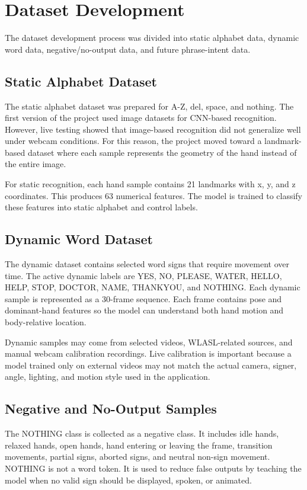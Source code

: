\section{Dataset Development}

The dataset development process was divided into static alphabet data, dynamic word data, negative/no-output data, and future phrase-intent data.

\subsection{Static Alphabet Dataset}

The static alphabet dataset was prepared for A-Z, del, space, and nothing. The first version of the project used image datasets for CNN-based recognition. However, live testing showed that image-based recognition did not generalize well under webcam conditions. For this reason, the project moved toward a landmark-based dataset where each sample represents the geometry of the hand instead of the entire image.

For static recognition, each hand sample contains 21 landmarks with x, y, and z coordinates. This produces 63 numerical features. The model is trained to classify these features into static alphabet and control labels.

\subsection{Dynamic Word Dataset}

The dynamic dataset contains selected word signs that require movement over time. The active dynamic labels are YES, NO, PLEASE, WATER, HELLO, HELP, STOP, DOCTOR, NAME, THANKYOU, and NOTHING. Each dynamic sample is represented as a 30-frame sequence. Each frame contains pose and dominant-hand features so the model can understand both hand motion and body-relative location.

Dynamic samples may come from selected videos, WLASL-related sources, and manual webcam calibration recordings. Live calibration is important because a model trained only on external videos may not match the actual camera, signer, angle, lighting, and motion style used in the application.

\subsection{Negative and No-Output Samples}

The NOTHING class is collected as a negative class. It includes idle hands, relaxed hands, open hands, hand entering or leaving the frame, transition movements, partial signs, aborted signs, and neutral non-sign movement. NOTHING is not a word token. It is used to reduce false outputs by teaching the model when no valid sign should be displayed, spoken, or animated.

